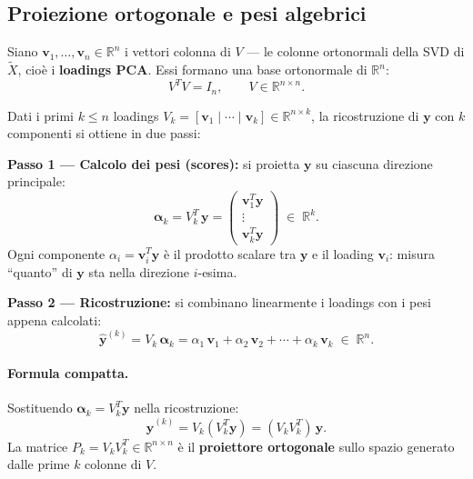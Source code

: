 \documentclass[11pt,a4paper]{article}
\theoremstyle{plain}
\theoremstyle{definition}
\theoremstyle{remark}
\begin{document}
\subsection{Proiezione ortogonale e pesi algebrici}

Siano $\mathbf{v}_1, \ldots, \mathbf{v}_n \in \mathbb{R}^n$ i vettori colonna
di $V$ --- le colonne ortonormali della SVD di $\tilde{X}$, cioè i
\textbf{loadings PCA}. Essi formano una base ortonormale di $\mathbb{R}^n$:
\[
  V^T V = I_n, \qquad V \in \mathbb{R}^{n \times n}.
\]

Dati i primi $k \leq n$ loadings $V_k = [\mathbf{v}_1 \mid \cdots \mid \mathbf{v}_k]
\in \mathbb{R}^{n \times k}$, la ricostruzione di $\mathbf{y}$ con $k$
componenti si ottiene in due passi:

\begin{keybox}
\textbf{Passo 1 --- Calcolo dei pesi (scores):} si proietta $\mathbf{y}$
su ciascuna direzione principale:
\[
  \boldsymbol{\alpha}_k = V_k^T\,\mathbf{y}
  = \begin{pmatrix} \mathbf{v}_1^T \mathbf{y} \\ \vdots \\ \mathbf{v}_k^T \mathbf{y} \end{pmatrix}
  \;\in\; \mathbb{R}^k.
\]
Ogni componente $\alpha_i = \mathbf{v}_i^T \mathbf{y}$ è il prodotto scalare
tra $\mathbf{y}$ e il loading $\mathbf{v}_i$: misura ``quanto'' di $\mathbf{y}$
sta nella direzione $i$-esima.

\medskip
\textbf{Passo 2 --- Ricostruzione:} si combinano linearmente i loadings
con i pesi appena calcolati:
\[
  \hat{\mathbf{y}}^{(k)} = V_k\,\boldsymbol{\alpha}_k
  = \alpha_1\,\mathbf{v}_1 + \alpha_2\,\mathbf{v}_2 + \cdots + \alpha_k\,\mathbf{v}_k
  \;\in\; \mathbb{R}^n.
\]
\end{keybox}

\paragraph{Formula compatta.}
Sostituendo $\boldsymbol{\alpha}_k = V_k^T \mathbf{y}$ nella ricostruzione:
\[
  \hat{\mathbf{y}}^{(k)} = V_k (V_k^T \mathbf{y}) = (V_k V_k^T)\,\mathbf{y}.
\]
La matrice $P_k = V_k V_k^T \in \mathbb{R}^{n \times n}$ è il \textbf{proiettore
ortogonale} sullo spazio generato dalle prime $k$ colonne di $V$.
\end{document}
